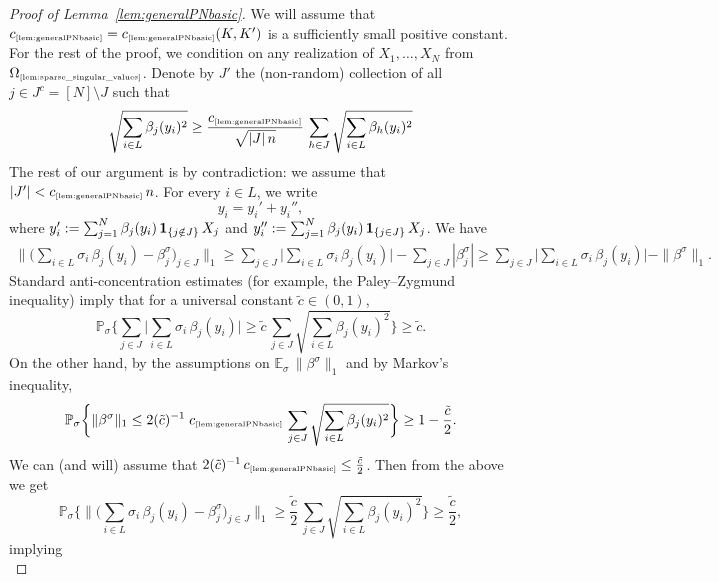 \documentclass[11pt]{amsart}
\theoremstyle{definition}
\theoremstyle{plain}
\def\Prob{{\mathbb P}}
\def\Prob{{\mathbb P}}
\def\Exp{{\mathbb E}}
\begin{document}
\begin{proof}[Proof of Lemma~\ref{lem:generalPNbasic}]
    We will assume that $c_{\text{\tiny\ref{lem:generalPNbasic}}}
    =c_{\text{\tiny\ref{lem:generalPNbasic}}}(K,K')$
    is a sufficiently small positive constant.
    For the rest of the proof, we condition 
    on any realization of $X_1,\dots,X_N$ from
    $\Omega_{\text{\tiny\ref{lem:sparse_singular_values}}}$.
    Denote by $J'$ the (non-random) collection of all
    $j\in J^c=[N]\setminus J$ such that
    $$
    \sqrt{\sum_{i\in L}\beta_j(y_i)^2}
    \geq 
    \frac{c_{\text{\tiny\ref{lem:generalPNbasic}}}}{\sqrt{|J|\,n}}\,
    \sum_{h\in J}\sqrt{\sum_{i\in L}\beta_h(y_i)^2}
    $$
    The rest of our argument is by contradiction:
    we assume that $|J'|<c_{\text{\tiny\ref{lem:generalPNbasic}}}\,n$.
    For every $i\in L$, we write
    $$
    y_i=y_i'+y_i'',
    $$
    where $y_i':=\sum_{j=1}^N \beta_j(y_i)\,
    {\bf 1}_{\{j\notin J\}}\,X_j$
    and 
    $y_i'':=\sum_{j=1}^N \beta_j(y_i)\,
    {\bf 1}_{\{j\in J\}}\,X_j$.
    We have
    \begin{align*}
    \Big\|
    \Big(\sum_{i\in L}\sigma_i\,\beta_j(y_i)-\beta^\sigma_j\Big)_{j\in J}\Big\|_1
    \geq 
    \sum_{j\in J}\Big|\sum_{i\in L}\sigma_i\,\beta_j(y_i)\Big|
    -\sum_{j\in J}|\beta^\sigma_j|
    \geq 
    \sum_{j\in J}\Big|\sum_{i\in L}\sigma_i\,\beta_j(y_i)\Big|
    - \|\beta^\sigma\|_1.
    \end{align*}
    Standard anti-concentration estimates
    (for example, the Paley--Zygmund inequality)
    imply that for a universal constant
    $\tilde c\in(0,1)$,
    $$
    \Prob_\sigma\bigg\{
    \sum_{j\in J}\Big|\sum_{i\in L}\sigma_i\,\beta_j(y_i)\Big|
    \geq 
    \tilde c\,\sum_{j\in J}\sqrt{\sum_{i\in L}\beta_j(y_i)^2}
    \bigg\}
    \geq \tilde c.
    $$
    On the other hand, by the assumptions on $\Exp_{\sigma}\,\|\beta^\sigma\|_1$
    and by Markov's inequality,
    $$
    \Prob_\sigma\bigg\{
    \|\beta^\sigma\|_1\leq 2(\tilde c)^{-1}\;
c_{\text{\tiny\ref{lem:generalPNbasic}}}\,
\sum_{j\in J}\sqrt{\sum_{i\in L}\beta_j(y_i)^2}
    \bigg\}\geq 1-\frac{\tilde c}{2}.
    $$
We can (and will) assume 
that $2(\tilde c)^{-1}\,c_{\text{\tiny\ref{lem:generalPNbasic}}}
\leq \frac{\tilde c}{2}$.
Then from the above we get
$$
\Prob_\sigma\bigg\{
\Big\|
\Big(\sum_{i\in L}\sigma_i\,\beta_j(y_i)-\beta^\sigma_j\Big)_{j\in J}\Big\|_1
\geq 
\frac{\tilde c}{2}\,\sum_{j\in J}\sqrt{\sum_{i\in L}\beta_j(y_i)^2}
\bigg\}
\geq \frac{\tilde c}{2},
$$
implying
    \begin{equation*}

\end{equation*}
\end{proof}
\end{document}
